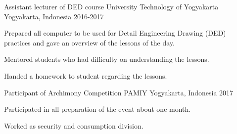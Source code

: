 \begin{cventries}
  \cventry
    {Assistant lecturer of DED course} %
    {University Technology of Yogyakarta} %
    {Yogyakarta, Indonesia} %
    {2016-2017} %
    {
      \begin{cvitems} %
        \item {Prepared all computer to be used for Detail Engineering Drawing (DED) practices and gave an overview of the lessons of the day.}
        \item{Mentored students who had difficulty on understanding the lessons.}
        \item{Handed a homework to student regarding the lessons.}
      \end{cvitems}
    }


  \cventry
    {Participant of Archimony Competition} %
    {PAMIY} %
    {Yogyakarta, Indonesia} %
    {2017} %
    {
      \begin{cvitems} %
      \item{Participated in all preparation of the event about one month.}
        \item {Worked as security and consumption division.}
      \end{cvitems}
    }
\end{cventries}
